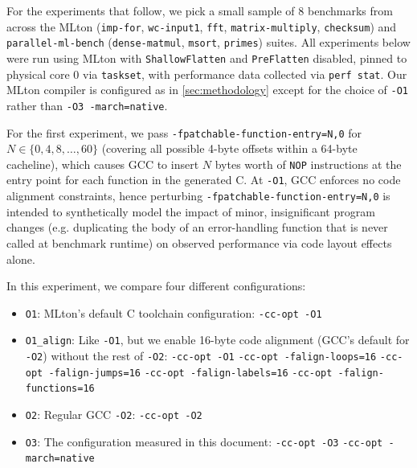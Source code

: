 For the experiments that follow, we pick a small sample of 8 benchmarks from
across the MLton (\texttt{imp-for}, \texttt{wc-input1}, \texttt{fft},
\texttt{matrix-multiply}, \texttt{checksum}) and \texttt{parallel-ml-bench}
(\texttt{dense-matmul}, \texttt{msort}, \texttt{primes}) suites. All experiments
below were run using MLton with \texttt{ShallowFlatten} and \texttt{PreFlatten}
disabled, pinned to physical core 0 via \texttt{taskset}, with performance data
collected via \texttt{perf stat}. Our MLton compiler is configured as in
\cref{sec:methodology} except for the choice of \texttt{-O1} rather than
\texttt{-O3 -march=native}.

For the first experiment, we pass \texttt{-fpatchable-function-entry=N,0} for $N
\in \{0, 4, 8, \dots, 60\}$ (covering all possible 4-byte offsets within a
  64-byte cacheline), which causes GCC to insert $N$ bytes worth of \texttt{NOP}
  instructions at the entry point for each function in the generated C. At
  \texttt{-O1}, GCC enforces no code alignment constraints, hence perturbing
  \texttt{-fpatchable-function-entry=N,0} is intended to synthetically model the
  impact of minor, insignificant program changes (e.g. duplicating the body of an
  error-handling function that is never called at benchmark runtime) on observed
  performance via code layout effects alone.

In this experiment, we compare four different configurations:
\begin{itemize}

\item \texttt{O1}: MLton's default C toolchain configuration: \texttt{-cc-opt -O1}

\item \texttt{O1\_align}: Like \texttt{-O1}, but we enable 16-byte code alignment
  (GCC's default for \texttt{-O2}) without the rest of \texttt{-O2}:
  \texttt{-cc-opt -O1} \texttt{-cc-opt -falign-loops=16}
  \texttt{-cc-opt -falign-jumps=16} \texttt{-cc-opt -falign-labels=16}
  \texttt{-cc-opt -falign-functions=16}

\item \texttt{O2}: Regular GCC \texttt{-O2}: \texttt{-cc-opt -O2}

\item \texttt{O3}: The configuration measured in this document:
  \texttt{-cc-opt -O3} \texttt{-cc-opt -march=native}

\end{itemize}

